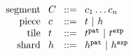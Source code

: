 \begin{figure}[h]
  \[\arraycolsep=4pt\begin{array}{rlrl}

    \text{segment} & \selection & ::= &
    \selem_1\dots\selem_n \\
    \text{piece} & \selem & ::= &
      \tile ~\vert~
      \shard \\

    \text{tile} & \tile & ::= &
       \tile^{\pat} ~\vert~
       \tile^{\expr} \\

    \text{shard} & \shard & ::= &
      \shard^{\pat} ~\vert~
      \shard^{\expr} \\
  \end{array}\]
\end{figure}